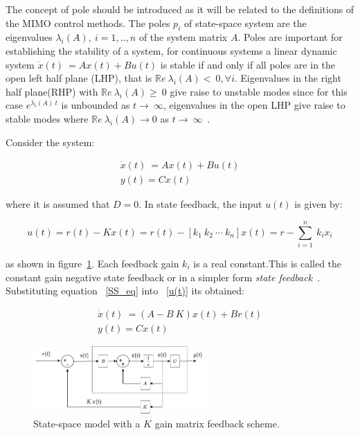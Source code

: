  The concept of pole should be introduced as it will be related to  the definitions of the MIMO control methods. The poles $p_i$ of state-space system are the eigenvalues $\lambda_i(A),~i=1,..,n$ of the system matrix $A$. Poles are important for establishing the stability of a system, for continuous systems a linear dynamic system  $	\dot{x}(t)~=Ax(t)+Bu(t)$ is stable if and only if all poles are in the open left half plane (LHP), that is $\mathbb{R}e~{\lambda_i(A)}<~0, \forall i$. Eigenvalues in the right half plane(RHP) with  $\mathbb{R}e~{\lambda_i(A)}\geq~0$ give raise to unstable modes since for this case $e^{\lambda_i(A)~t}$ is unbounded as $t\rightarrow~\infty$,  eigenvalues in the open LHP give raise to stable modes where $\mathbb{R}e~{\lambda_i(A)} \rightarrow 0$ as $t\rightarrow~\infty$~\cite[Chapter~4]{Skogestad}.
\smallskip

Consider the system:

\begin{align} 
	\dot{x}(t)~=Ax(t)+Bu(t) 	\label{SS_eq}\\
y(t)=Cx(t) \nonumber
\end{align}

where it is assumed that $D=0$. In state feedback, the input $u(t)$ is given by:

\begin{equation}
	u(t)=r(t)-Kx(t) = r(t)-[k_1~ k_2~\cdots ~k_n] x(t)=r-\sum_{i=1}^{n}~k_ix_i
	\label{u(t)}
\end{equation}

as shown in figure~\ref{SS_schm}. Each feedback gain $k_i$ is a real constant.This is called the constant gain negative state feedback or in a simpler form \textit{state feedback}~\cite{Chen1999}. Substituting equation ~\ref{SS_eq} into ~\ref{u(t)} its obtained:

\begin{align} 
\dot{x}(t)~=(A-B~K)x(t)+Br(t) \label{SS_eq_feed} \\
y(t)=Cx(t) \nonumber
\end{align}



\begin{figure}[h]
	\centering
	\includegraphics[width=0.6\textwidth]{Chp2/SS_scheme.png}
	\caption{  State-space model with a $K$ gain matrix feedback scheme.\label{SS_schm}}
\end{figure}


